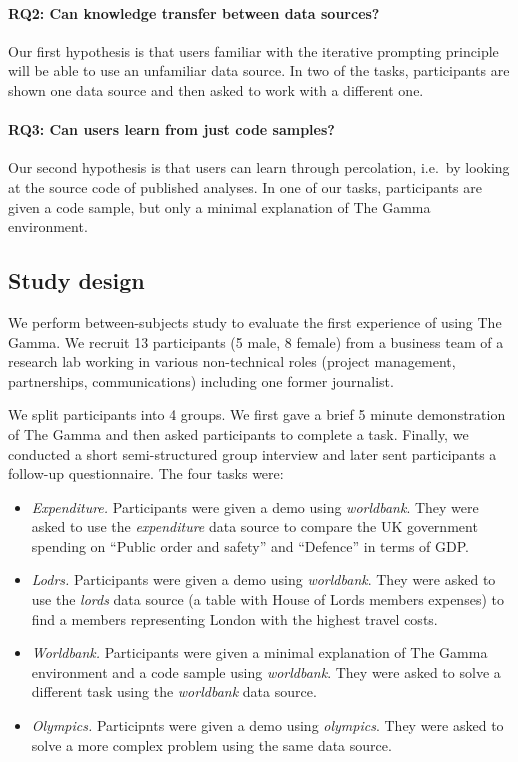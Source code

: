 \documentclass[manuscript,review,anonymous]{acmart}
\begin{document}
\paragraph{RQ2: Can knowledge transfer between data sources?}
Our first hypothesis is that users familiar with the iterative prompting principle will be able to
use an unfamiliar data source. In two of the tasks, participants are shown one data source and
then asked to work with a different one.

\paragraph{RQ3: Can users learn from just code samples?}
Our second hypothesis is that users can learn through percolation, i.e.~by looking at the source
code of published analyses. In one of our tasks, participants are given a code sample, but only a
minimal explanation of The Gamma environment.

\subsection{Study design}
We perform between-subjects study to evaluate the first experience of using The Gamma.
We recruit 13 participants (5 male, 8 female) from a business team
of a research lab working in various non-technical roles (project management,
partnerships, communications) including one former journalist.

We split participants into 4 groups. We first gave a brief 5 minute demonstration of The
Gamma and then asked participants to complete a task. Finally, we conducted a short semi-structured
group interview and later sent participants a follow-up questionnaire. The four tasks were:

\begin{itemize}
\item \emph{Expenditure.} Participants were given a demo using \emph{worldbank}.
  They were asked to use the \emph{expenditure} data source to compare the UK government spending
  on ``Public order and safety'' and ``Defence'' in terms of GDP.
\item \emph{Lodrs.} Participants were given a demo using \emph{worldbank}.
  They were asked to use the \emph{lords} data source (a table with House of Lords
  members expenses) to find a members representing London with the highest travel costs.
\item \emph{Worldbank.} Participants were given a minimal explanation of The Gamma environment and
  a code sample using \emph{worldbank}. They were asked to solve a different task using
  the \emph{worldbank} data source.
\item \emph{Olympics.} Participnts were given a demo using \emph{olympics}.
  They were asked to solve a more complex problem using the same data source.
\end{itemize}
\end{document}
